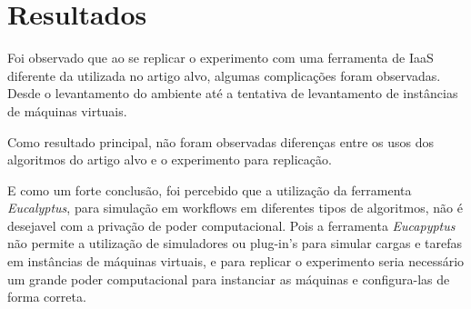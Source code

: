 \section{Resultados}

Foi observado que ao se replicar o experimento com uma ferramenta de IaaS diferente da utilizada no artigo alvo, algumas complicações foram observadas. Desde o levantamento do ambiente até a tentativa de levantamento de instâncias de máquinas virtuais.

Como resultado principal, não foram observadas diferenças entre os usos dos algoritmos do artigo alvo e o experimento para replicação.

E como um forte conclusão, foi percebido que a utilização da ferramenta \textit{Eucalyptus}, para simulação em workflows em diferentes tipos de algoritmos, não é desejavel com a privação de poder computacional. Pois a ferramenta \textit{Eucapyptus} não permite a utilização de simuladores ou plug-in's para simular cargas e tarefas em instâncias de máquinas virtuais, e para replicar o experimento seria necessário um grande poder computacional para instanciar as máquinas e configura-las de forma correta.
